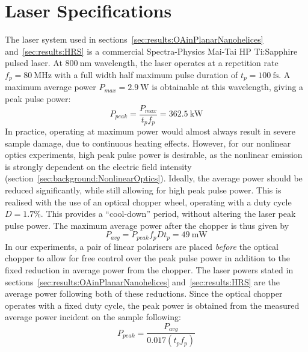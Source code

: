 \section{Laser Specifications}\label{sec:appendix:hardware:maitai}

The laser system used in sections~\ref{sec:results:OAinPlanarNanohelices} and~\ref{sec:results:HRS} is a commercial Spectra-Physics Mai-Tai HP Ti:Sapphire pulsed laser. 
At $\SI{800}{\nano\m}$ wavelength, the laser operates at a repetition rate $f_p = \SI{80}{\mega\hertz}$ with a full width half maximum pulse duration of $t_p = \SI{100}{\femto\s}$. 
A maximum average power $P_{max} = \SI{2.9}{\watt}$ is obtainable at this wavelength, giving a peak pulse power:
\begin{equation}
    P_{peak} = \frac{P_{max}}{t_p f_p} = \SI{362.5}{\kilo\watt}
\end{equation}
In practice, operating at maximum power would almost always result in severe sample damage, due to continuous heating effects. However, for our nonlinear optics experiments, high peak pulse power is desirable, as the nonlinear emission is strongly dependent on the electric field intensity (section~\ref{sec:background:NonlinearOptics}). Ideally, the average power should be reduced significantly, while still allowing for high peak pulse power. This is realised with the use of an optical chopper wheel, operating with a duty cycle $D = 1.7\%$. This provides a ``cool-down'' period, without altering the laser peak pulse power. The maximum average power after the chopper is thus given by
\begin{equation}
    P_{avg} =  P_{peak} f_p D t_p = \SI{49}{\milli\watt}
\end{equation}
In our experiments, a pair of linear polarisers are placed \textit{before} the optical chopper to allow for free control over the peak pulse power in addition to the fixed reduction in average power from the chopper. The laser powers stated in sections~\ref{sec:results:OAinPlanarNanohelices} and~\ref{sec:results:HRS} are the average power following both of these reductions. Since the optical chopper operates with a fixed duty cycle, the peak power is obtained from the measured average power incident on the sample following:
\begin{equation}
    P_{peak} = \frac{P_{avg}}{0.017(t_p f_p)}
\end{equation}